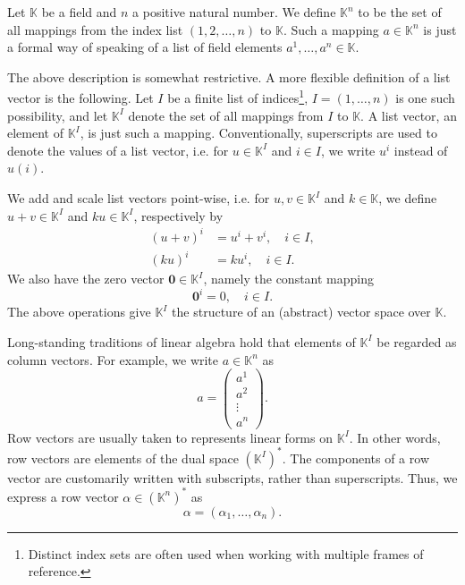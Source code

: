 \documentclass[12pt]{article}
\newcommand{\va}{a}
\newcommand{\vu}{u}
\newcommand{\vv}{v}
\newcommand{\bzero}{\mathbf{0}}
\newcommand{\kfield}{\mathbb{K}}
\newcommand{\lp}{\left(}
\newcommand{\rp}{\right)}
\begin{document}
Let $\kfield$ be a field and $n$ a positive natural number.  We define
$\kfield^n$ to be the set of all mappings from the index list
$(1,2,\ldots,n)$ to $\kfield$.  Such a mapping $\va\in \kfield^n$ is
just a formal way of speaking of a list of field elements
$\va^1,\ldots, \va^n\in\kfield$.

The above description is somewhat restrictive. A more flexible
definition of a list vector is the following.  Let $I$ be a finite
list of indices\footnote{Distinct index sets are often used when
  working with multiple frames of reference.}, $I=(1,\ldots,n)$ is one
such possibility, and let $\kfield^I$ denote the set of all mappings
from $I$ to $\kfield$.  A list vector, an element of $\kfield^I$, is
just such a mapping.  Conventionally, superscripts are used to denote
the values of a list vector, i.e. for $\vu\in \kfield^I$ and $i\in I$,
we write $\vu^i$ instead of $\vu(i)$.

We add and scale list vectors point-wise, i.e. for $\vu, \vv \in
\kfield^I$ and $k\in \kfield$, we define $\vu+\vv\in \kfield^I$ and $k\vu\in
\kfield^I$, respectively by
\begin{align*}
(\vu+\vv)^i &= \vu^i+\vv^i,\quad i\in I,\\
(k\vu)^i &= k \vu^i,\quad i\in I.
\end{align*}
We also have the zero vector $\bzero\in \kfield^I$, namely the constant mapping
$$\bzero^i = 0,\quad i\in I.$$
The above operations give $\kfield^I$ the
structure of an (abstract) vector space over $\kfield$.

Long-standing traditions of linear algebra hold that elements of
$\kfield^I$ be regarded as column vectors.  For example, we write
$\va\in \kfield^n$ as
$$\va = 
\begin{pmatrix}
  \va^1 \\ \va^2 \\ \vdots \\ \va^n
\end{pmatrix}.$$
Row vectors are usually taken to represents linear forms on
$\kfield^I$.  In other words, row vectors are elements of the dual
space $\lp\kfield^I\rp^*$.  The components of a row vector are
customarily written with subscripts, rather than superscripts.  Thus,
we express a row vector $\alpha\in\lp\kfield^n\rp^*$ as 
$$\alpha = (\alpha_1,\ldots,\alpha_n).$$
\end{document}
